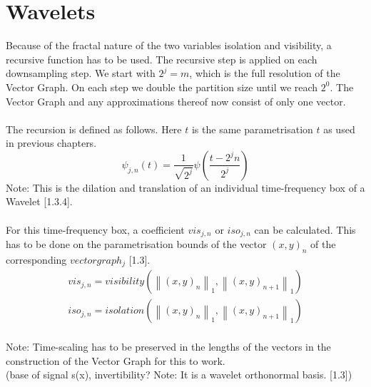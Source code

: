 \documentclass{report}
\newcommand\norm[1]{\left\lVert#1\right\rVert}
\begin{document}
\chapter{Wavelets}
Because of the fractal nature of the two variables isolation and visibility, a recursive function has to be used. The recursive step is applied on each downsampling step. We start with $2^j=m$, which is the full resolution of the Vector Graph. On each step we double the partition size until we reach $2^0$. The Vector Graph and any approximations thereof now consist of only one vector.\\\\
The recursion is defined as follows. Here $t$ is the same parametrisation $t$ as used in previous chapters.
\begin{equation}
\psi_{j,n}(t)=\frac{1}{\sqrt{2^j}}\psi(\frac{t-2^j n}{2^j})
\end{equation}
Note: This is the dilation and translation of an individual time-frequency box of a Wavelet \cite{Mallat}[1.3.4].\\\\
For this time-frequency box, a coefficient $vis_{j,n}$ or $iso_{j,n}$ can be calculated. This has to be done on the parametrisation bounds of the vector $(x,y)_n$ of the corresponding $vectorgraph_{j}$ \cite{Grapher}[1.3].
\begin{align}
vis_{j,n}=visibility(\norm{(x,y)_{n}}_{1},\norm{(x,y)_{n+1}}_{1})\\
iso_{j,n}=isolation(\norm{(x,y)_{n}}_{1},\norm{(x,y)_{n+1}}_{1})
\end{align}\\
Note: Time-scaling has to be preserved in the lengths of the vectors in the construction of the Vector Graph for this to work.\\
(base of signal s(x), invertibility? Note: It is a wavelet orthonormal basis. \cite{Mallat}[1.3])
\end{document}
